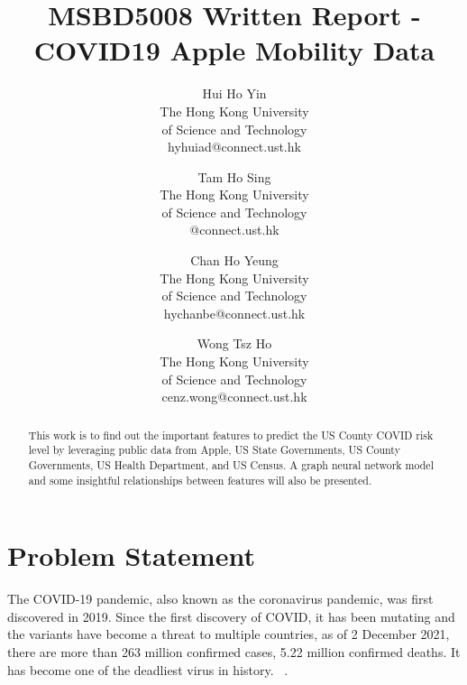

\date{}

\title{\Large \bf MSBD5008 Written Report - COVID19 Apple Mobility Data
}

\author{
{\rm Hui Ho Yin}\\
The Hong Kong University\\
of Science and Technology\\
hyhuiad@connect.ust.hk
\and
{\rm Tam Ho Sing}\\
The Hong Kong University\\
of Science and Technology\\
@connect.ust.hk
\and
{\rm Chan Ho Yeung}\\
The Hong Kong University\\
of Science and Technology\\
hychanbe@connect.ust.hk
\and
{\rm Wong Tsz Ho}\\
The Hong Kong University\\
of Science and Technology\\
cenz.wong@connect.ust.hk
} %

\maketitle

\begin{abstract}
This work is to find out the important features to predict the US County COVID risk level by leveraging public data from Apple, US State Governments, US County Governments, US Health Department, and US Census. A graph neural network model and some insightful relationships between features will also be presented.
\end{abstract}


\section{Problem Statement}
The COVID-19 pandemic, also known as the coronavirus pandemic, was first discovered in 2019. Since the first discovery of COVID, it has been mutating and the variants have become a threat to multiple countries, as of 2 December 2021, there are more than 263 million confirmed cases, 5.22 million confirmed deaths. It has become one of the deadliest virus in history.  ~\cite{coviddata}. \\

